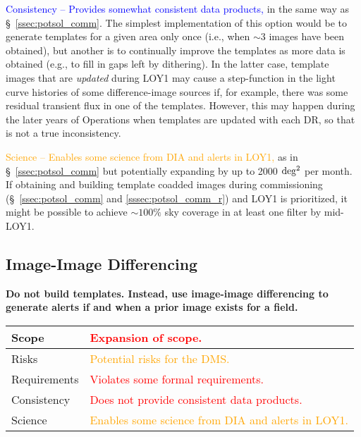 \documentclass[DM,lsstdraft,toc]{lsstdoc}
\begin{document}
\textcolor{blue}{ Consistency -- Provides somewhat consistent data products,} in the same way as \S~\ref{ssec:potsol_comm}. The simplest implementation of this option would be to generate templates for a given area only once (i.e., when $\sim$3 images have been obtained), but another is to continually improve the templates as more data is obtained (e.g., to fill in gaps left by dithering). In the latter case, template images that are {\em updated} during LOY1 may cause a step-function in the light curve histories of some difference-image sources if, for example, there was some residual transient flux in one of the templates. However, this may happen during the later years of Operations when templates are updated with each DR, so that is not a true inconsistency.

\textcolor{orange}{ Science -- Enables some science from DIA and alerts in LOY1,} as in \S~\ref{ssec:potsol_comm} but potentially expanding by up to 2000 $\rm deg^2$ per month. If obtaining and building template coadded images during commissioning (\S~\ref{ssec:potsol_comm} and \ref{sssec:potsol_comm_r}) and LOY1 is prioritized, it might be possible to achieve $\sim100\%$ sky coverage in at least one filter by mid-LOY1.


\clearpage
\subsection{Image-Image Differencing}\label{ssec:potsol_imgimg}

{\bf Do not build templates. Instead, use image-image differencing to generate alerts if and when a prior image exists for a field.}

\begin{center}
\begin{tabular}{|p{2.5cm}|p{13cm}|}
\hline
Scope & \textcolor{red}{Expansion of scope.} \\
\hline
Risks & \textcolor{orange}{Potential risks for the DMS.} \\
\hline
Requirements & \textcolor{red}{Violates some formal requirements.} \\
\hline
Consistency & \textcolor{red}{Does not provide consistent data products.} \\
\hline
Science & \textcolor{orange}{Enables some science from DIA and alerts in LOY1.} \\
\hline
\end{tabular}
\end{center}
\end{document}
